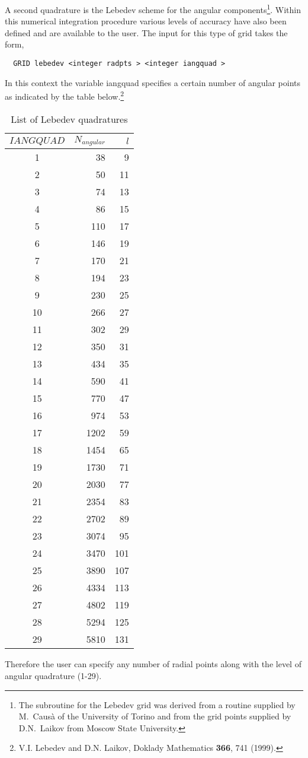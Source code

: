 A second quadrature is the Lebedev
scheme for the angular components\footnote{The subroutine 
for the Lebedev grid was derived from a routine supplied by M.~Caus\`a
of the University of Torino and from the grid points supplied by
D.N.~Laikov from Moscow State University.}.  
Within this numerical integration procedure various levels 
of accuracy have also been defined and are available to the user.  
The input for this type of grid takes the form,
\begin{verbatim}
  GRID lebedev <integer radpts > <integer iangquad > 
\end{verbatim}
In this context the variable iangquad specifies a certain number of
angular points as indicated by the table below.\footnote{
V.I. Lebedev and D.N. Laikov, Doklady Mathematics {\bf 366}, 741
(1999).
}
\begin{table}[htp]
\begin{center}
\begin{tabular}[right]{|c|rr|} \hline
$IANGQUAD$ & $N_{angular}$ & $l$\\
\hline
 1&   38&   9  \\
 2&   50&  11  \\
 3&   74 & 13  \\
 4&   86 & 15  \\
 5&  110 & 17  \\
 6&  146 & 19  \\
 7&  170 & 21  \\
 8&  194 & 23  \\
 9&  230 & 25  \\
10&  266&  27  \\
11&  302&  29  \\
12&  350&  31  \\
13&  434&  35  \\
14&  590&  41  \\
15&  770&  47  \\
16&  974&  53  \\
17& 1202&  59  \\
18& 1454&   65 \\
19& 1730&   71 \\
20& 2030&   77 \\
21& 2354&   83 \\
22& 2702&   89 \\ 
23& 3074&   95 \\
24& 3470&  101 \\
25& 3890&  107 \\
26& 4334&  113 \\
27& 4802&  119 \\
28& 5294&  125 \\
29& 5810&  131 \\
\hline
\end{tabular}
\end{center}
\caption{List of Lebedev quadratures}
\end{table}
Therefore the user can specify any number of radial points along with
the level of angular quadrature (1-29).

